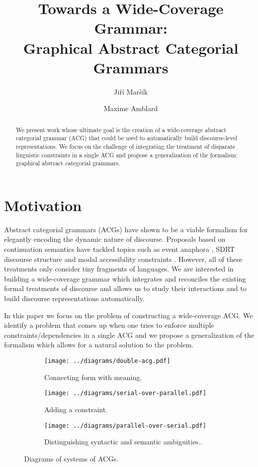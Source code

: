 \documentclass[twocolumn]{article}
\begin{document}
\title{Towards a Wide-Coverage Grammar: \\ Graphical Abstract Categorial Grammars}
\author{Jiří Maršík \and Maxime Amblard}
\maketitle

\begin{abstract}
  We present work whose ultimate goal is the creation of a wide-coverage
  abstract categorial grammar (ACG) that could be used to automatically
  build discourse-level representations. We focus on the challenge of
  integrating the treatment of disparate linguistic constraints in a
  single ACG and propose a generalization of the formalism: graphical
  abstract categorial grammars.
\end{abstract}

\section{Motivation}

Abstract categorial grammars (ACGs) have shown to be a viable formalism
for elegantly encoding the dynamic nature of discourse. Proposals based
on continuation semantics \cite{de2006towards} have tackled topics such
as event anaphora \cite{qian2011event}, SDRT discourse structure
\cite{asher2011sdrt} and modal accessibility constraints
\cite{asher2011montagovian}. However, all of these treatments only
consider tiny fragments of languages. We are interested in building a
wide-coverage grammar which integrates and reconciles the existing
formal treatments of discourse and allows us to study their interactions
and to build discourse representations automatically.

In this paper we focus on the problem of constructing a wide-coverage
ACG. We identify a problem that comes up when one tries to enforce
multiple constraints/dependencies in a single ACG and we propose a
generalization of the formalism which allows for a natural solution to
the problem.


\begin{figure*}[t]
  \centering
  \begin{subfigure}[b]{0.25\textwidth}
    \centering
    \texttt{[image: ../diagrams/double-acg.pdf]}
    \caption{\label{fig:acg-comp-basic} Connecting form with meaning.}
  \end{subfigure}
  \qquad
  \begin{subfigure}[b]{0.25\textwidth}
    \centering
    \texttt{[image: ../diagrams/serial-over-parallel.pdf]}
    \caption{\label{fig:acg-comp-constr} Adding a constraint.}
  \end{subfigure}
  \qquad
  \begin{subfigure}[b]{0.25\textwidth}
    \centering
    \texttt{[image: ../diagrams/parallel-over-serial.pdf]}
    \caption{\label{fig:acg-comp-sem} Distinguishing syntactic and
      semantic ambiguities..}
  \end{subfigure}
  \caption{\label{fig:acg-comp} Diagrams of systems of ACGs.}
\end{figure*}
\end{document}
